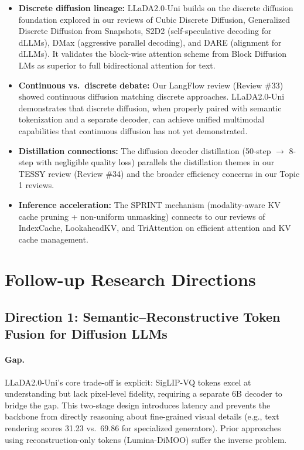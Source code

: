 \documentclass[11pt]{article}
\begin{document}
\begin{itemize}
    \item \textbf{Discrete diffusion lineage:} LLaDA2.0-Uni builds on the discrete diffusion foundation explored in our reviews of Cubic Discrete Diffusion, Generalized Discrete Diffusion from Snapshots, S2D2 (self-speculative decoding for dLLMs), DMax (aggressive parallel decoding), and DARE (alignment for dLLMs). It validates the block-wise attention scheme from Block Diffusion LMs as superior to full bidirectional attention for text.
    \item \textbf{Continuous vs.\ discrete debate:} Our LangFlow review (Review \#33) showed continuous diffusion matching discrete approaches. LLaDA2.0-Uni demonstrates that discrete diffusion, when properly paired with semantic tokenization and a separate decoder, can achieve unified multimodal capabilities that continuous diffusion has not yet demonstrated.
    \item \textbf{Distillation connections:} The diffusion decoder distillation (50-step $\to$ 8-step with negligible quality loss) parallels the distillation themes in our TESSY review (Review \#34) and the broader efficiency concerns in our Topic 1 reviews.
    \item \textbf{Inference acceleration:} The SPRINT mechanism (modality-aware KV cache pruning + non-uniform unmasking) connects to our reviews of IndexCache, LookaheadKV, and TriAttention on efficient attention and KV cache management.
\end{itemize}

\section{Follow-up Research Directions}

\subsection{Direction 1: Semantic--Reconstructive Token Fusion for Diffusion LLMs}

\paragraph{Gap.}
LLaDA2.0-Uni's core trade-off is explicit: SigLIP-VQ tokens excel at understanding but lack pixel-level fidelity, requiring a separate 6B decoder to bridge the gap. This two-stage design introduces latency and prevents the backbone from directly reasoning about fine-grained visual details (e.g., text rendering scores 31.23 vs.\ 69.86 for specialized generators). Prior approaches using reconstruction-only tokens (Lumina-DiMOO) suffer the inverse problem.
\end{document}
